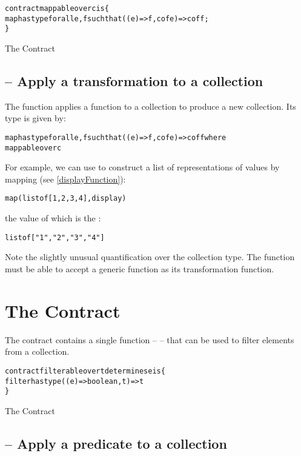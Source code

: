 \begin{program}[H]
\begin{alltt}
contract mappable over c is \{
  map has type for all e,f such that ((e)=>f,c of e) => c of f;
\}
\end{alltt}
\caption{The  Contract\label{mapContractProg}}
\end{program}

\subsection{ -- Apply a transformation to a collection}
\label{mapFunction}

The  function applies a function to a collection to produce a new collection. Its type is given by:
\begin{alltt}
map has type for all e,f such that ((e)=>f,c of e) => c of f where
  mappable over c
\end{alltt}
For example, we can use  to construct a list of  representations of  values by mapping  (see \vref{displayFunction}):

\begin{alltt}
map(list of [1,2,3,4],display)
\end{alltt}
the value of which is the :
\begin{alltt}
list of ["1","2","3","4"]
\end{alltt}

Note the slightly unusual quantification over the collection type. The  function must be able to accept a generic function as its transformation function.

\section{The  Contract}
\label{filterableContract}
The  contract contains a single function --  -- that can be used to filter elements from a collection.


\begin{program}[H]
\begin{alltt}
contract filterable over t determines e is \{
  filter has type ((e)=>boolean,t) => t
\}
\end{alltt}
\caption{The  Contract\label{filterContractProg}}
\end{program}


\subsection{ -- Apply a predicate to a collection}
\label{filterFunction}

